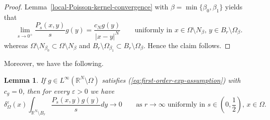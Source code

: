 \documentclass[notitlepage,11pt,reqno]{amsart}
\newtheorem{lemma}[theorem]{Lemma}
\theoremstyle{definition}
\numberwithin{equation}{section}
\newcommand{\eps}{{\varepsilon}}
\newcommand{\R}{\mathds{R}}
\newcommand{\RR}{\mathds{R}}
\begin{document}
\begin{proof}
  Lemma~\ref{local-Poisson-kernel-convergence} with $\beta=\min\{\beta_0,\beta_1\}$ yields that
  $$
\lim_{s \to 0^+} \frac{P_s(x, y)}{s}g(y) = \frac{c_Ng(y)}{|x-y|^N} \qquad \text{uniformly in $x \in \Omega \setminus N_\beta$, $y \in B_r \setminus \Omega_{\beta}$.}
$$
whereas $\Omega \setminus N_{\beta_0} \subset \Omega \setminus N_\beta$ and $B_r \setminus \Omega_{\beta_1} \subset B_r \setminus \Omega_{\beta}$. Hence the claim follows.
\end{proof}


Moreover, we have the following.
\begin{lemma}
\label{remainder-integral-uniform-est}  
If $g \in L^\infty(\R^N \setminus \Omega)$ satisfies (\ref{eq:first-order-exp-assumption}) with $c_g = 0$, then for every $\eps>0$ we have
\begin{equation}
  \label{ps-lim-r-infty}
\delta_\Omega^\eps(x) \int_{\RR^N \setminus B_{r}} \frac{P_s(x,y)g(y)}{s}dy \to 0 \qquad \text{as $r \to  \infty$ uniformly in $s \in (0,\frac{1}{2})$, $x \in \Omega$.}  
\end{equation}
\end{lemma}
\end{document}
